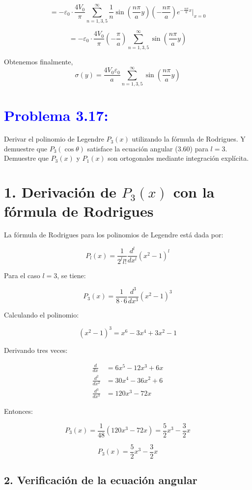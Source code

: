 \documentclass[12pt]{article}
\newcommand{\question}[1]{\textcolor{blue}{\textbf{#1}}}
\begin{document}
\[
= -\varepsilon_0 \cdot \frac{4V_0}{\pi} \sum_{n=1,3,5}^\infty \frac{1}{n} \sin\left( \frac{n\pi}{a} y \right) \left( -\frac{n\pi}{a} \right) e^{-\frac{n\pi}{a}x} \bigg|_{x=0}
\]

\[
= -\varepsilon_0 \cdot \frac{4V_0}{\pi} \left( -\frac{\pi}{a} \right) \sum_{n=1,3,5}^\infty \sin\left( \frac{n\pi}{a} y \right)
\]

Obtenemos finalmente,
\[
\boxed{
\sigma(y) = \frac{4V_0 \varepsilon_0}{a} \sum_{n=1,3,5}^\infty \sin\left( \frac{n\pi}{a} y \right)
}
\]

 \section*{\question{Problema 3.17:}} Derivar el polinomio de Legendre \( P_3(x) \) utilizando la fórmula de Rodrigues. Y demuestre  que \( P_3(\cos\theta) \) satisface la ecuación angular (3.60)  para \( l = 3 \).
  Demuestre que \( P_3(x) \) y \( P_1(x) \) son ortogonales  mediante integración explícita.

\section*{1. Derivación de \( P_3(x) \) con la fórmula de Rodrigues}

La fórmula de Rodrigues para los polinomios de Legendre está dada por:

\[
P_l(x) = \frac{1}{2^l l!} \frac{d^l}{dx^l} \left( x^2 - 1 \right)^l
\]

Para el caso \( l = 3 \), se tiene:

\[
P_3(x) = \frac{1}{8 \cdot 6} \frac{d^3}{dx^3} \left( x^2 - 1 \right)^3
\]

Calculando el polinomio:

\[
(x^2 - 1)^3 = x^6 - 3x^4 + 3x^2 - 1
\]

Derivando tres veces:

\begin{align*}
\frac{d}{dx} &= 6x^5 - 12x^3 + 6x \\
\frac{d^2}{dx^2} &= 30x^4 - 36x^2 + 6 \\
\frac{d^3}{dx^3} &= 120x^3 - 72x
\end{align*}

Entonces:

\[
P_3(x) = \frac{1}{48} (120x^3 - 72x) = \frac{5}{2}x^3 - \frac{3}{2}x
\]

\[
\boxed{P_3(x) = \frac{5}{2}x^3 - \frac{3}{2}x}
\]

\subsection*{2. Verificación de la ecuación angular}
\end{document}
